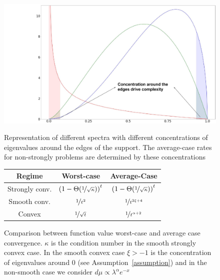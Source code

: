 \documentclass{article}
\begin{document}
\begin{figure}[t]
\centering
\begin{minipage}{0.40\textwidth} \vspace{0 pt} %
\includegraphics[clip, trim=4cm 0cm 0cm 0cm,width = 1.0 \linewidth]{new_imgs/new_spectrum.pdf}

\begin{small}
\caption{\small 
Representation of different spectra with different concentrations of eigenvalues around the edges of the support. The average-case rates for non-strongly problems are determined by these concentrations }
\end{small}
\end{minipage}%
\hfill
\begin{minipage}{0.55 \textwidth} \vspace{0 cm } %
\begin{small}
\captionsetup{type=table} %
    \begin{tabular}{c|c|c}
         Regime&Worst-case& Average-Case  \\
         \hline
         Strongly conv. & $\left(1-\Theta(\nicefrac{1}{\sqrt{\kappa}})\right)^t$ &
         $\left(1-\Theta(\nicefrac{1}{\sqrt{\kappa}})\right)^t$\\ 
         \hline
         Smooth conv. & $\nicefrac{1}{t^2}$ & $\nicefrac{1}{t^{2\xi+4}}$\\
         \hline
          Convex& $\nicefrac{1}{\sqrt{t}}$ & $\nicefrac{1}{t^{\alpha+2}}$
    \end{tabular}
    \vspace{ 0.5 cm}
    \caption{Comparison between function value worst-case and average case convergence. $\kappa$ is the condition number in the smooth strongly convex case. In the smooth convex case $\xi> -1$ is the concentration of eigenvalues around $0$ (see Assumption~\ref{assumption}) and in the non-smooth case we consider $d\mu\propto \lambda^\alpha e^{-x}$ }\label{table: rates}

\end{small}

\end{minipage}


\end{figure}
\end{document}
